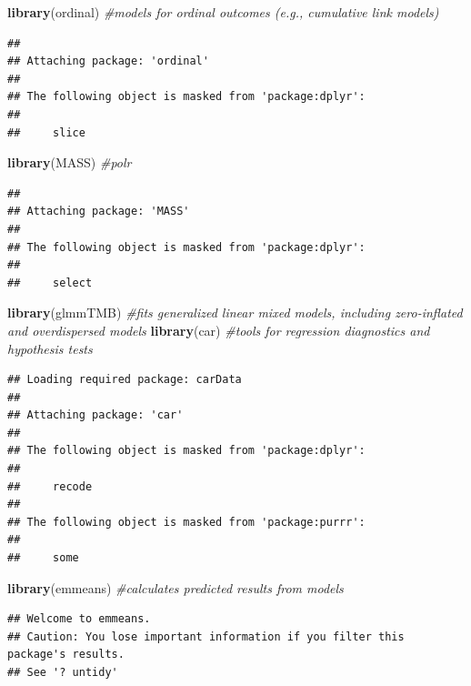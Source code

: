 \documentclass[
]{article}
\newenvironment{Shaded}{\begin{snugshade}}{\end{snugshade}}
\newcommand{\CommentTok}[1]{\textcolor[rgb]{0.56,0.35,0.01}{\textit{#1}}}
\newcommand{\FunctionTok}[1]{\textcolor[rgb]{0.13,0.29,0.53}{\textbf{#1}}}
\newcommand{\NormalTok}[1]{#1}
\begin{document}
\begin{Shaded}
\begin{Highlighting}[]
\FunctionTok{library}\NormalTok{(ordinal)     }\CommentTok{\#models for ordinal outcomes (e.g., cumulative link models)}
\end{Highlighting}
\end{Shaded}

\begin{verbatim}
## 
## Attaching package: 'ordinal'
## 
## The following object is masked from 'package:dplyr':
## 
##     slice
\end{verbatim}

\begin{Shaded}
\begin{Highlighting}[]
\FunctionTok{library}\NormalTok{(MASS)        }\CommentTok{\#polr}
\end{Highlighting}
\end{Shaded}

\begin{verbatim}
## 
## Attaching package: 'MASS'
## 
## The following object is masked from 'package:dplyr':
## 
##     select
\end{verbatim}

\begin{Shaded}
\begin{Highlighting}[]
\FunctionTok{library}\NormalTok{(glmmTMB)     }\CommentTok{\#fits generalized linear mixed models, including zero{-}inflated and overdispersed models}
\FunctionTok{library}\NormalTok{(car)         }\CommentTok{\#tools for regression diagnostics and hypothesis tests}
\end{Highlighting}
\end{Shaded}

\begin{verbatim}
## Loading required package: carData
## 
## Attaching package: 'car'
## 
## The following object is masked from 'package:dplyr':
## 
##     recode
## 
## The following object is masked from 'package:purrr':
## 
##     some
\end{verbatim}

\begin{Shaded}
\begin{Highlighting}[]
\FunctionTok{library}\NormalTok{(emmeans)     }\CommentTok{\#calculates predicted results from models}
\end{Highlighting}
\end{Shaded}

\begin{verbatim}
## Welcome to emmeans.
## Caution: You lose important information if you filter this package's results.
## See '? untidy'
\end{verbatim}
\end{document}
